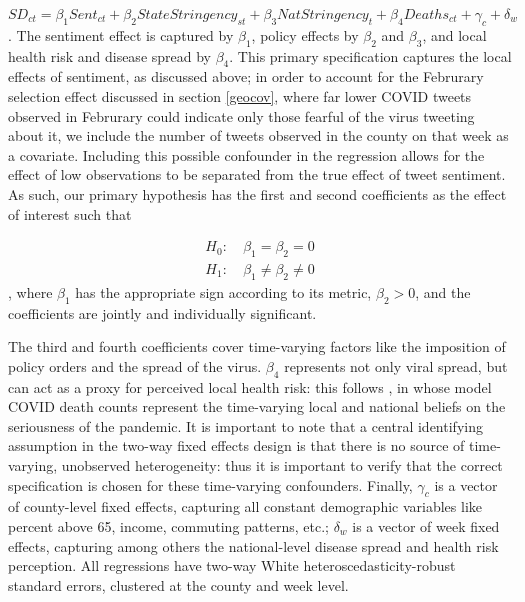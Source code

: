 \documentclass{article}
\begin{document}
\begin{equation}
  \label{eq:mainspec}
  SD_{ct} = \beta_1 Sent_{ct}  + \beta_2 StateStringency_{st} + \beta_3 NatStringency_{t} + \beta_4 Deaths_{ct} + \gamma_c + \delta_w
\end{equation}. The sentiment effect is captured by \(\beta_1\), policy effects by \(\beta_2\) and \(\beta_3\), and local health risk and disease spread by \(\beta_4\). This primary specification captures the local effects of sentiment, as discussed above; in order to account for the Februrary selection effect discussed in section \ref{geocov}, where far lower COVID tweets observed in Februrary could indicate only those fearful of the virus tweeting about it, we include the number of tweets observed in the county on that week as a covariate. Including this possible confounder in the regression allows for the effect of low observations to be separated from the true effect of tweet sentiment. As such, our primary hypothesis has the first and second coefficients as the effect of interest such that

\begin{align*}
  H_0 : &\: \beta_1 = \beta_2 = 0 \\
  H_1 : &\: \beta_1 \neq \beta_2 \neq 0
\end{align*}, where \(\beta_1\) has the appropriate sign according to its metric, \(\beta_2 > 0\), and the coefficients are jointly and individually significant.

The third and fourth coefficients cover time-varying factors like the imposition of policy orders and the spread of the virus. \(\beta_4\) represents not only viral spread, but can act as a proxy for perceived local health risk: this follows \textcite{chernozhukovCausalImpactMasks2021}, in whose model COVID death counts represent the time-varying local and national beliefs on the seriousness of the pandemic. It is important to note that a central identifying assumption in the two-way fixed effects design is that there is no source of time-varying, unobserved heterogeneity: thus it is important to verify that the correct specification is chosen for these time-varying confounders. Finally, \(\gamma_c\) is a vector of county-level fixed effects, capturing all constant demographic variables like percent above 65, income, commuting patterns, etc.; \(\delta_w\) is a vector of week fixed effects, capturing among others the national-level disease spread and health risk perception. All regressions have two-way White heteroscedasticity-robust standard errors, clustered at the county and week level.
\end{document}
